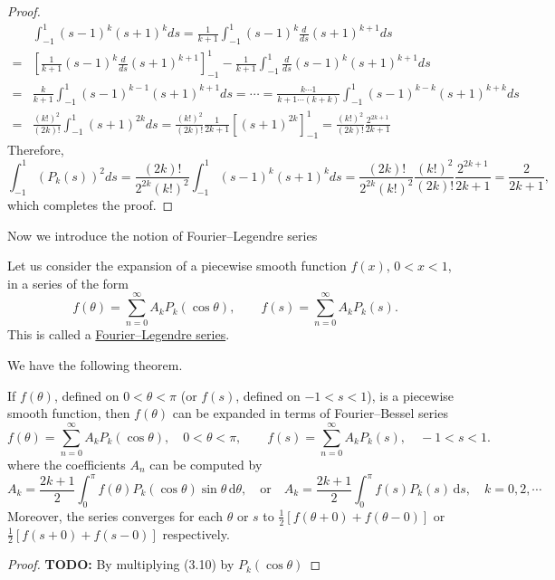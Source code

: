 \begin{proof}
\begin{equation}\label{eq.proof_orthogonal_Legendre_5}
\begin{split}
    &\int_{-1}^1 \left(s-1\right)^k \left(s+1\right)^k d s = \frac{1}{k+1}\int_{-1}^1 \left(s-1\right)^k \frac{d}{ds}\left(s+1\right)^{k+1} d s
    \\
    =& \left[\frac{1}{k+1}\left(s-1\right)^k \frac{d}{ds}\left(s+1\right)^{k+1}\right]^1_{-1} - \frac{1}{k+1}\int_{-1}^1 \frac{d}{ds}\left(s-1\right)^k \left(s+1\right)^{k+1} d s
    \\
    =&  \frac{k}{k+1}\int_{-1}^1 \left(s-1\right)^{k-1}\left(s+1\right)^{k+1} d s = \cdots = \frac{k\cdots 1}{k+1\cdots (k+k)}\int_{-1}^1 \left(s-1\right)^{k-k}\left(s+1\right)^{k+k} d s
    \\
    =& \frac{(k!)^2}{(2k)!} \int_{-1}^1 \left(s+1\right)^{2k} d s = \frac{(k!)^2}{(2k)!}\frac{1}{2k+1} \left[\left(s+1\right)^{2k}\right]_{-1}^1 = \frac{(k!)^2}{(2k)!}\frac{2^{2k+1}}{2k+1}
\end{split}
\end{equation}
Therefore,
\begin{equation}\label{eq.proof_orthogonal_Legendre_6}
    \int_{-1}^1 (P_k(s))^2 d s = \frac{(2k)!}{2^{2k} (k!)^2}\int_{-1}^1 \left(s-1\right)^k \left(s+1\right)^k d s = \frac{(2k)!}{2^{2k} (k!)^2}\frac{(k!)^2}{(2k)!}\frac{2^{2k+1}}{2k+1} = \frac{2}{2k+1},
\end{equation}
which completes the proof.
\end{proof}

Now we introduce the notion of Fourier--Legendre series

\begin{definition}
Let us consider the expansion of a piecewise smooth function $f(x)$, $0<x<1$, in a series of the form
$$
f(\theta)=\sum_{n=0}^{\infty} A_k P_k(\cos \theta), \qquad f(s)=\sum_{n=0}^{\infty} A_k P_k(s).
$$ 
This is called a \underline{Fourier--Legendre series}. 
\end{definition}

We have the following theorem.

\begin{theorem}[]
If $f(\theta)$, defined on $0<\theta<\pi$ (or $f(s)$, defined on $-1<s<1$), is a piecewise smooth function, then $f(\theta)$ can be expanded in terms of Fourier--Bessel series
$$
    f(\theta)=\sum_{n=0}^{\infty} A_k P_k(\cos \theta),\quad 0<\theta<\pi, \qquad f(s)=\sum_{n=0}^{\infty} A_k P_k(s),\quad -1<s<1.
$$
where the coefficients $A_n$ can be computed by
\begin{equation}\label{eq.Legendre_formula_coef}
    A_k = \frac{2k+1}{2}\int_0^\pi f(\theta)P_k(\cos\theta) \sin\theta\, \mathrm{d}\theta,\quad \textrm{or}\quad A_k = \frac{2k+1}{2}\int_0^\pi f(s)P_k(s) \, \mathrm{d}s, \quad k=0,2, \cdots
\end{equation}
Moreover, the series converges for each $\theta$ or $s$ to $\frac{1}{2}[f(\theta+0)+f(\theta-0)]$ or $\frac{1}{2}[f(s+0)+f(s-0)]$ respectively.
\end{theorem}
\begin{proof}
    \textbf{TODO: } By multiplying (3.10) by $P_k(\cos\theta)$
\end{proof}

